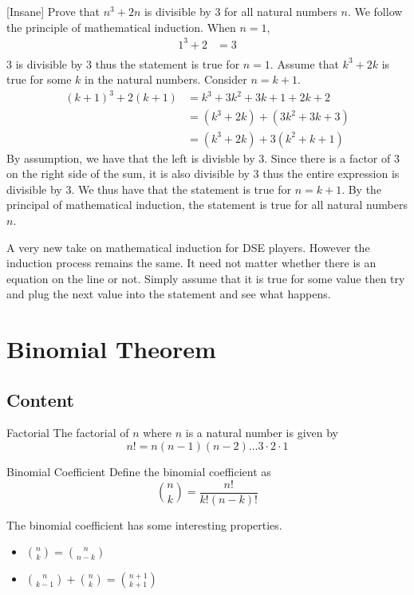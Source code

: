 \documentclass[a4paper]{article}
\begin{document}
\begin{eg}{[Insane]}{} Prove that $n^3+2n$ is divisible by $3$ for all natural numbers $n$. 
We follow the principle of mathematical induction. When $n=1$, 
\begin{align*}
1^3+2&=3\\
\end{align*} $3$ is divisible by $3$ thus the statement is true for $n=1$. \linebreak\linebreak
Assume that $k^3+2k$ is true for some $k$ in the natural numbers. Consider $n=k+1$. 
\begin{align*}
(k+1)^3+2(k+1)&=k^3+3k^2+3k+1+2k+2\\
&=(k^3+2k)+(3k^2+3k+3)\\
&=(k^3+2k)+3(k^2+k+1)
\end{align*} By assumption, we have that the left is divisble by $3$. Since there is a factor of $3$ on the right side of the sum, it is also divisible by $3$ thus the entire expression is divisible by $3$. We thus have that the statement is true for $n=k+1$. By the principal of mathematical induction, the statement is true for all natural numbers $n$. 
\end{eg}
A very new take on mathematical induction for DSE players. However the induction process remains the same. It need not matter whether there is an equation on the line or not. Simply assume that it is true for some value then try and plug the next value into the statement and see what happens. 

\pagebreak
\section{Binomial Theorem}
\subsection{Content}
\begin{defn}{Factorial}{} The factorial of $n$ where $n$ is a natural number is given by $$n!=n(n-1)(n-2)\dots3\cdot2\cdot1$$
\end{defn}

\begin{defn}{Binomial Coefficient}{} Define the binomial coefficient as $$\binom{n}{k}=\frac{n!}{k!(n-k)!}$$
\end{defn}

\begin{prp}{}{} The binomial coefficient has some interesting properties. 
\begin{itemize}
\item $\binom{n}{k}=\binom{n}{n-k}$
\item $\binom{n}{k-1}+\binom{n}{k}=\binom{n+1}{k+1}$
\end{itemize}
\end{prp}
\end{document}
